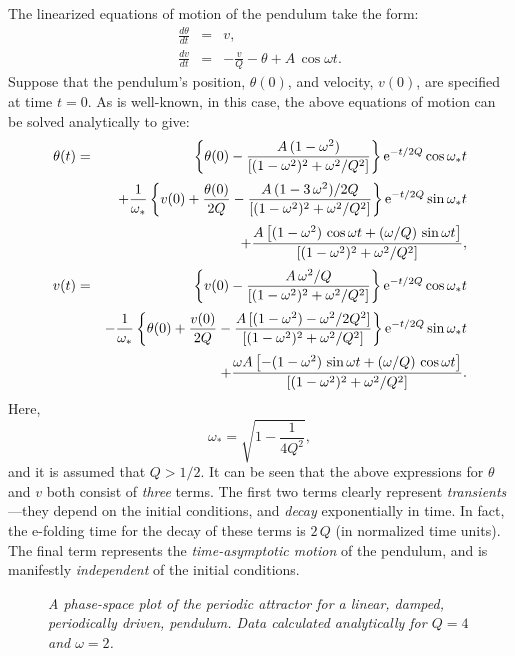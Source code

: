 The linearized equations of motion of the pendulum take the form:
\begin{eqnarray}
\frac{d\theta}{dt} &=& v,\label{e5.13}\\[0.5ex]
\frac{dv}{dt} &=& -\frac{v}{Q} -\theta + A\,\cos\omega t.\label{e5.14}
\end{eqnarray}
 Suppose
that the pendulum's position, $\theta(0)$, and velocity, $v(0)$,  are specified at time $t=0$. 
As is well-known, in this case, the above equations of motion can be solved analytically to give:
\begin{eqnarray}
\theta(t) &=&\left\{\theta(0) - \frac{A\,(1-\omega^2)}{[(1-\omega^2)^2+\omega^2/Q^2]}\right\}
{\rm e}^{-t/2Q}\cos\omega_\ast t\nonumber\\[0.5ex]
&&+\frac{1}{\omega_\ast}\left\{ v(0) + \frac{\theta(0)}{2Q}
-\frac{A\,(1-3\,\omega^2)/2Q}
{[(1-\omega^2)^2+ \omega^2/Q^2]}\right\}{\rm e}^{-t/2Q}\sin\omega_\ast t\nonumber\\[0.5ex]
 &&+\frac{A\left[(1-\omega^2)\,\cos\omega t+ (\omega/Q)\,\sin\omega t\right]}
{\left[(1-\omega^2)^2+\omega^2/Q^2\right]},\label{e5.15}\\[0.5ex]
v(t) &=& \left\{v(0) - \frac{A\,\omega^2/Q}{[(1-\omega^2)^2+\omega^2/Q^2]}\right\}
{\rm e}^{-t/2Q}\cos\omega_\ast t\nonumber\\[0.5ex]
&&-\frac{1}{\omega_\ast}\left\{ \theta(0) + \frac{v(0)}{2Q}
-\frac{A\,[(1-\omega^2)-\omega^2/2Q^2]}
{[(1-\omega^2)^2+ \omega^2/Q^2]}\right\}{\rm e}^{-t/2Q}\sin\omega_\ast t\nonumber\\[0.5ex]
&&+\frac{\omega A\left[-(1-\omega^2)\,\sin\omega t+ (\omega/Q)\,\cos\omega t\right]}
{\left[(1-\omega^2)^2+\omega^2/Q^2\right]}.\label{e5.16}
\end{eqnarray}
Here, 
\begin{equation}
\omega_\ast = \sqrt{1-\frac{1}{4Q^2}},
\end{equation}
and it is assumed that $Q>1/2$. 
It can be seen that the above expressions for $\theta$ and $v$  both consist  of {\em three}
terms. The first two terms clearly represent {\em transients}---they depend on the initial
conditions, and {\em decay} exponentially in time. In fact, the e-folding time for the decay of these
terms is $2\,Q$ (in normalized time units). 
The final term represents the {\em time-asymptotic motion} of the pendulum, and is manifestly {\em independent} of the initial conditions.

\begin{figure}
\epsfysize=3in
\centerline{}
\caption{\em A phase-space plot of the periodic attractor for a linear, damped, periodically
driven, pendulum. Data calculated analytically for $Q=4$ and $\omega=2$. }\label{cf2}
\end{figure}

